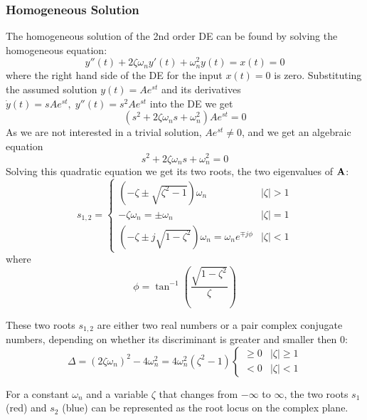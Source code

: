 
\subsubsection*{Homogeneous Solution}



The homogeneous solution of the 2nd order DE can be found
by solving the homogeneous equation:
\[
y''(t)+2\zeta\omega_n y'(t)+\omega_n^2 y(t)=x(t)=0
\]
where the right hand side of the DE for the input $x(t)=0$ is 
zero. Substituting the assumed solution $y(t)=Ae^{st}$ and its 
derivatives $\dot{y}(t)=s Ae^{st},\;y''(t)=s^2 Ae^{st}$ into
the DE we get
\[
(s^2+2\zeta\omega_n s+\omega_n^2)Ae^{st}=0 
\]
As we are not interested in a trivial solution, $Ae^{st}\ne 0$, and
we get an algebraic equation
\[ 
s^2+2\zeta\omega_n s+\omega_n^2=0 
\]
Solving this quadratic equation we get its two roots, the two 
eigenvalues of ${\bf A}$:
\[ 
s_{1,2}=\left\{\begin{array}{ll}
\left(-\zeta\pm\sqrt{\zeta^2-1}\right)\omega_n&|\zeta|> 1\\
-\zeta\omega_n=\pm\omega_n & |\zeta|=1\\
\left(-\zeta\pm j\sqrt{1-\zeta^2}\right)\omega_n=\omega_n e^{\mp j\phi} 
&|\zeta|< 1\end{array}\right.
\]
where
\[
\phi=\tan^{-1}\left(\frac{\sqrt{1-\zeta^2}}{\zeta}\right) 
\]

These two roots $s_{1,2}$ are either two real numbers or a pair 
complex conjugate numbers, depending on whether its discriminant 
is greater and smaller then 0:
\[
\Delta=(2\zeta\omega_n)^2-4\omega_n^2=4\omega_n^2(\zeta^2-1)
\left\{\begin{array}{ll}\ge 0 & |\zeta|\ge 1\\< 0 & |\zeta|< 1\end{array}\right.
\]


For a constant $\omega_n$ and a variable $\zeta$ that changes 
from $-\infty$ to $\infty$, the two roots $s_1$ (red) and $s_2$ 
(blue) can be represented as the root locus on the complex plane.


